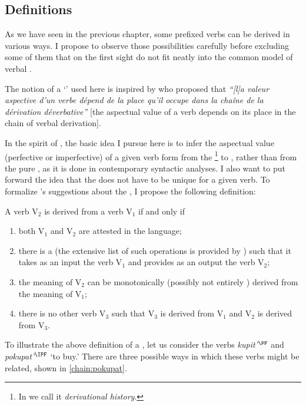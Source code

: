 \subsection{Definitions}\label{section:chains:definition}
As we have seen in the previous chapter, some prefixed verbs can be derived in various ways. I propose to observe those possibilities carefully before excluding some of them that on the first sight do not fit neatly into the common model of verbal .

The notion of a `' used here is inspired by \citet{Karcevski:27} who proposed that \textit{``[l]a valeur aspective d'un verbe d\'{e}pend de la place qu'il occupe dans la cha\^{i}ne de la d\'{e}rivation d\'{e}verbative''} [the aspectual value of a verb depends on its place in the chain of verbal derivation].

In the spirit of \citet{Karcevski:27}, the basic idea I pursue here is to infer the aspectual value (perfective or imperfective) of a given verb form from the \footnote{In \citet{ZinovaFilip:14b} we call it \textit{derivational history}.} to , rather than from the pure , as it is done in contemporary syntactic analyses. I also want to put forward the idea that the  does not have to be unique for a given verb. To formalize \citeauthor{Karcevski:27}'s \citeyear{Karcevski:27} suggestions about the , I propose the following definition:
\begin{definition}\label{def:history}
A verb V$_2$ is derived from a verb V$_1$ if and only if
\begin{enumerate}
\item both V$_1$ and V$_2$ are attested in the language;
\item there is a  (the extensive list of such operations is provided by \citealt{Shvedova:82}) such that it takes as an input the verb V$_1$ and provides as an output the verb V$_2$;
\item the meaning of V$_2$ can be monotonically (possibly not entirely ) derived from the meaning of V$_1$;
\item there is no other verb V$_3$ such that V$_3$ is derived from V$_1$ and V$_2$ is derived from V$_3$.
\end{enumerate}
\end{definition}

To illustrate the above definition of a , let us consider the verbs \textit{kupit'$^\PF$} and \textit{pokupat'$^\IPF$} `to buy.' There are three possible ways in which these verbs might be related, shown in \ref{chain:pokupat}.


